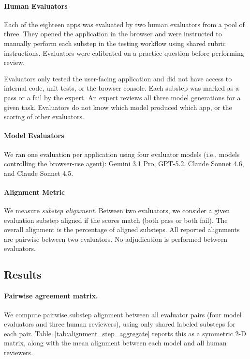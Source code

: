 \paragraph{Human Evaluators} Each of the eighteen apps was evaluated by two human evaluators from a pool of three. They opened the application in the browser and were instructed to manually perform each substep in the testing workflow using shared rubric instructions. Evaluators were calibrated on a practice question before performing review.

Evaluators only tested the user-facing application and did not have access to internal code, unit tests, or the browser console. Each substep was marked as a pass or a fail by the expert. An expert reviews all three model generations for a given task. Evaluators do not know which model produced which app, or the scoring of other evaluators.

\paragraph{Model Evaluators} We ran one evaluation per application using four evaluator models (i.e., models controlling the browser-use agent): Gemini 3.1 Pro, GPT-5.2, Claude Sonnet 4.6, and Claude Sonnet 4.5.

\paragraph{Alignment Metric} We measure \textit{substep alignment}. Between two evaluators, we consider a given evaluation substep aligned if the scores match (both pass or both fail). The overall alignment is the percentage of aligned substeps. All reported alignments are pairwise between two evaluators. No adjudication is performed between evaluators.

\subsection{Results}

\paragraph{Pairwise agreement matrix.}
We compute pairwise substep alignment between all evaluator pairs (four model evaluators and three human reviewers), using only shared labeled substeps for each pair. Table~\ref{tab:alignment_step_aggregate} reports this as a symmetric 2-D matrix, along with the mean alignment between each model and all human reviewers.


